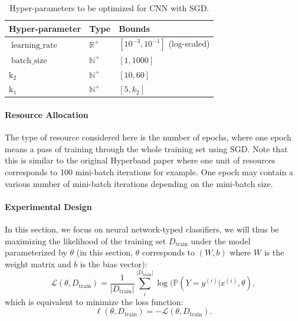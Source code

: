 \documentclass[runningheads,a4paper]{llncs}
\begin{document}
\begin{table}[ht]
\centering
\begin{tabular}{@{}lll@{}}
\toprule
\textbf{Hyper-parameter} & \textbf{Type}                      & \textbf{Bounds}               \\ \midrule
$\operatorname{learning\_rate}$                & $\mathbb{R}^+$ & $\left[ 10^{-3}, 10^{-1} \right]$ (log-scaled) \\
$\operatorname{batch\_size}$           & $\mathbb{N}^+$ & $\left[1, 1000 \right]$         \\
$\operatorname{k_2}$           & $\mathbb{N}^+$ & $\left[10,  60 \right]$         \\
$\operatorname{k_1}$           & $\mathbb{N}^+$ & $\left[5,  k_2 \right]$         \\ \bottomrule
\end{tabular}
\caption{Hyper-parameters to be optimized for CNN with SGD.}
\label{cnn_sgd}
\end{table}

\paragraph{\textbf{Resource Allocation}} The type of resource considered here is the number of epochs, where one epoch means a pass of training through the whole training set using SGD. Note that this is similar to the original Hyperband paper where one unit of resources corresponds to 100 mini-batch iterations for example. One epoch may contain a various number of mini-batch iterations depending on the mini-batch size.

\paragraph{\textbf{Experimental Design}} In this section, we focus on neural network-typed classifiers, we will thus be maximizing the likelihood of the training set $D_{\operatorname{train}}$ under the model parameterized by $\theta$ (in this section, $\theta$ corresponds to $(W, b)$ where $W$ is the weight matrix and $b$ is the bias vector):
\[
\mathcal{L}(\theta, D_{\operatorname{train}}) = \frac{1}{|D_{\operatorname{train}}|} \sum_i^{|D_{\operatorname{train}}|} \log (\mathbb{P}(Y=y^{(i)}|x^{(i)},\theta),
\]
which is equivalent to minimize the loss function:
\[
\ell(\theta, D_{\operatorname{train}}) = -\mathcal{L}(\theta, D_{\operatorname{train}}).
\]
\end{document}
